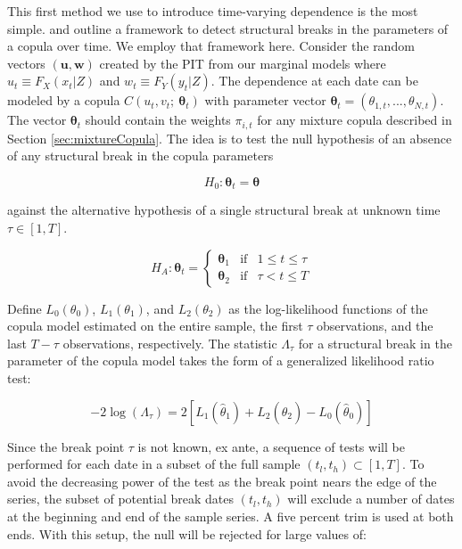 \documentclass[12pt]{article}
\begin{document}
This first method we use to introduce time-varying dependence is the most simple. \cite{Dias_and_Embrechts_2004} and \cite{Dias_and_Embrechts_2009} outline a framework to detect structural breaks in the parameters of a copula over time. We employ that framework here. Consider the random vectors $\left(\boldsymbol{u}, \boldsymbol{w}\right)$ created by the PIT from our marginal models where $u_{t}\equiv F_{X}\left(x_{t}|Z\right)$ and $w_{t}\equiv F_{Y}\left(y_{t} | Z\right)$. The dependence at each date can be modeled by a copula $C\left(u_{t}, v_{t};~\boldsymbol{\theta}_{t}\right)$ with parameter vector $\boldsymbol{\theta}_{t}=(\theta_{1,t},...,\theta_{N,t})$. The vector $\boldsymbol{\theta}_{t}$ should contain the weights $\pi _{i,t}$ for any mixture copula described in Section \ref{sec:mixtureCopula}. The idea is to test the null hypothesis of an absence of any structural break in the copula parameters

\begin{equation}
	H_{0}:\boldsymbol{\theta}_{t} = \boldsymbol{\theta}
\end{equation}

against the alternative hypothesis of a single structural break at unknown time $\tau \in \left[1, T\right]$.

\begin{equation}
H_{A}:\boldsymbol{\theta}_{t} = \left\{
\begin{array}{ccc}
    \boldsymbol{\theta}_{1} & \text{if} & 1\leq t \leq \tau \\ 
    \boldsymbol{\theta}_{2} & \text{if} & \tau < t \leq T
\end{array}
\right. 
\end{equation}

Define $L_{0}\left(\theta_{0}\right)$, $L_{1}\left(\theta_{1}\right)$, and $L_{2}\left(\theta_{2}\right)$ as the log-likelihood functions of the copula model estimated on the entire sample, the first $\tau$ observations, and the last $T-\tau$ observations, respectively. The statistic $\Lambda_{\tau}$ for a structural break in the parameter of the copula model takes the form of a generalized likelihood ratio test:

\begin{equation}
	-2\log \left(\Lambda_{\tau}\right) = 2\left[L_{1}\left(\hat{\theta}_{1}\right) + L_{2}\left(\hat{\theta}_{2}\right) - L_{0}\left(\hat{\theta}_{0}\right)\right]
\end{equation}

Since the break point $\tau$ is not known, ex ante, a sequence of tests will be performed for each date in a subset of the full sample $\left(t_{l},t_{h}\right) \subset \left[1, T\right]$. To avoid the decreasing power of the test as the break point nears the edge of the series, the subset of potential break dates $\left( t_{l},t_{h}\right)$ will exclude a number of dates at the beginning and end of the sample series. A five percent trim is used at both ends. With this setup, the null will be rejected for large values of:
\end{document}
